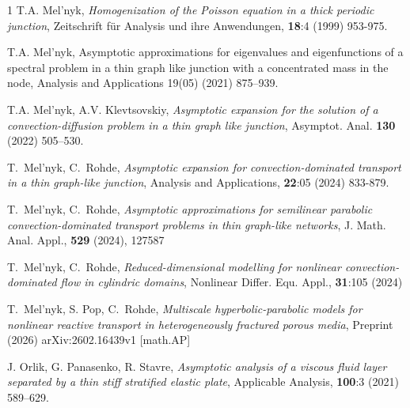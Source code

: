 \documentclass[reqno]{amsart}            %
\numberwithin{equation}{section}
\begin{document}
\begin{thebibliography}{1}
		T.A. Mel’nyk, \textit{Homogenization of the Poisson equation in a thick periodic junction}, Zeitschrift f\"ur Analysis
		und ihre Anwendungen, \textbf{18}:4 (1999) 953-975. %
		
		T.A. Mel’nyk, Asymptotic approximations for eigenvalues and eigenfunctions of a spectral problem in a thin graph
		like junction with a concentrated mass in the node, Analysis and Applications 19(05) (2021) 875–939. 
		
		T.A. Mel’nyk, A.V. Klevtsovskiy, \textit{Asymptotic expansion for the solution of a convection-diffusion problem in a thin graph
			like junction}, Asymptot. Anal. \textbf{130} (2022) 505–530. %
		
		
		T.~Mel'nyk,  C.~Rohde, \textit{Asymptotic expansion for convection-dominated transport in a thin graph-like junction},	
		Analysis and Applications, \textbf{22}:05 (2024) 833-879. 
		
		T.~Mel'nyk,  C.~Rohde, \textit{Asymptotic approximations for semilinear parabolic convection-dominated transport problems in thin graph-like networks}, J. Math.  Anal. Appl., \textbf{529} (2024), 127587
		
		T.~Mel'nyk,  C.~Rohde, \textit{ Reduced-dimensional modelling for nonlinear convection-dominated flow in cylindric domains},
		Nonlinear Differ. Equ. Appl., \textbf{31}:105 (2024) %
		
		
		T.~Mel'nyk,  S. Pop, C.~Rohde, \textit{Multiscale hyperbolic-parabolic models for nonlinear reactive transport in heterogeneously fractured porous media}, Preprint (2026) arXiv:2602.16439v1 [math.AP]  
		
		J. Orlik, G. Panasenko, R. Stavre, \textit{Asymptotic analysis of a viscous fluid layer separated by a thin stiff stratified elastic plate}, Applicable Analysis, \textbf{100}:3 (2021) 589–629. 
	\end{thebibliography}
	
\end{document}
